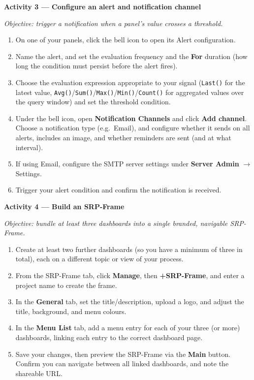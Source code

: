 \begin{procedure}
  \textbf{Activity 3 --- Configure an alert and notification channel}\vspace{2pt}

  \textit{Objective: trigger a notification when a panel's value crosses a threshold.}

  \begin{enumerate}
    \item On one of your panels, click the bell icon to open its Alert configuration.
    \item Name the alert, and set the evaluation frequency and the \textbf{For} duration (how long the condition must persist before the alert fires).
    \item Choose the evaluation expression appropriate to your signal (\texttt{Last()} for the latest value, \texttt{Avg()}/\texttt{Sum()}/\texttt{Max()}/\texttt{Min()}/\texttt{Count()} for aggregated values over the query window) and set the threshold condition.
    \item Under the bell icon, open \textbf{Notification Channels} and click \textbf{Add channel}. Choose a notification type (e.g.\ Email), and configure whether it sends on all alerts, includes an image, and whether reminders are sent (and at what interval).
    \item If using Email, configure the SMTP server settings under \textbf{Server Admin} $\to$ Settings.
    \item Trigger your alert condition and confirm the notification is received.
  \end{enumerate}
  \vspace*{1.5em}

  \textbf{Activity 4 --- Build an SRP-Frame}\vspace{2pt}

  \textit{Objective: bundle at least three dashboards into a single branded, navigable SRP-Frame.}

  \begin{enumerate}
    \item Create at least two further dashboards (so you have a minimum of three in total), each on a different topic or view of your process.
    \item From the SRP-Frame tab, click \textbf{Manage}, then \textbf{+SRP-Frame}, and enter a project name to create the frame.
    \item In the \textbf{General} tab, set the title/description, upload a logo, and adjust the title, background, and menu colours.
    \item In the \textbf{Menu List} tab, add a menu entry for each of your three (or more) dashboards, linking each entry to the correct dashboard page.
    \item Save your changes, then preview the SRP-Frame via the \textbf{Main} button. Confirm you can navigate between all linked dashboards, and note the shareable URL.
  \end{enumerate}

\end{procedure}

